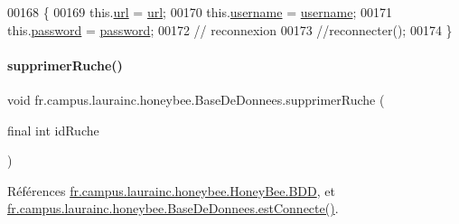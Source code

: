\begin{DoxyCode}
00168     \{
00169         this.\hyperlink{classfr_1_1campus_1_1laurainc_1_1honeybee_1_1_base_de_donnees_ad1d04b4da375002e91d8370b9d19918e}{url} = \hyperlink{classfr_1_1campus_1_1laurainc_1_1honeybee_1_1_base_de_donnees_ad1d04b4da375002e91d8370b9d19918e}{url};
00170         this.\hyperlink{classfr_1_1campus_1_1laurainc_1_1honeybee_1_1_base_de_donnees_a7d1662e10f11f740155774b625ed1a87}{username} = \hyperlink{classfr_1_1campus_1_1laurainc_1_1honeybee_1_1_base_de_donnees_a7d1662e10f11f740155774b625ed1a87}{username};
00171         this.\hyperlink{classfr_1_1campus_1_1laurainc_1_1honeybee_1_1_base_de_donnees_af1bb604a666a7eee9edd93b6cafaf064}{password} = \hyperlink{classfr_1_1campus_1_1laurainc_1_1honeybee_1_1_base_de_donnees_af1bb604a666a7eee9edd93b6cafaf064}{password};
00172         \textcolor{comment}{// reconnexion}
00173         \textcolor{comment}{//reconnecter();}
00174     \}
\end{DoxyCode}
\mbox{\label{classfr_1_1campus_1_1laurainc_1_1honeybee_1_1_base_de_donnees_a7b0977566d74684fab184f7a5efce3c8}} 
\paragraph{\texorpdfstring{supprimer\+Ruche()}{supprimerRuche()}}
{\footnotesize\ttfamily void fr.\+campus.\+laurainc.\+honeybee.\+Base\+De\+Donnees.\+supprimer\+Ruche (\begin{DoxyParamCaption}\item[{final int}]{id\+Ruche }\end{DoxyParamCaption})}



Références \hyperlink{classfr_1_1campus_1_1laurainc_1_1honeybee_1_1_honey_bee_abfb4f6cc1c8bb793c37ccb8408abc51c}{fr.\+campus.\+laurainc.\+honeybee.\+Honey\+Bee.\+B\+DD}, et \hyperlink{classfr_1_1campus_1_1laurainc_1_1honeybee_1_1_base_de_donnees_a735f54c2c183a595c9a9a5ba947491f5}{fr.\+campus.\+laurainc.\+honeybee.\+Base\+De\+Donnees.\+est\+Connecte()}.



